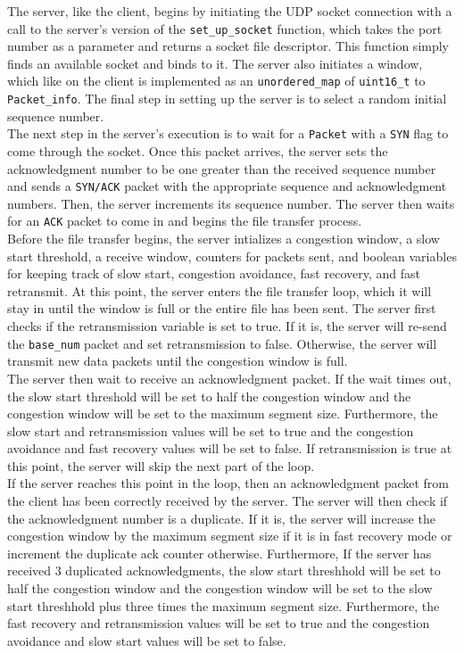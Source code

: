 \documentclass{article}
\begin{document}
\noindent
The server, like the client, begins by initiating the UDP socket connection with a call to the server's version of the \texttt{set\_up\_socket} function, which takes the port number as a parameter and returns a socket file descriptor. This function simply finds an available socket and binds to it. The server also initiates a window, which like on the client is implemented as an \texttt{unordered\_map} of \texttt{uint16\_t} to \texttt{Packet\_info}. The final step in setting up the server is to select a random initial sequence number. \\

\noindent
The next step in the server's execution is to wait for a \texttt{Packet} with a \texttt{SYN} flag to come through the socket. Once this packet arrives, the server sets the acknowledgment number to be one greater than the received sequence number and sends a \texttt{SYN/ACK} packet with the appropriate sequence and acknowledgment numbers. Then, the server increments its sequence number. The server then waits for an \texttt{ACK} packet to come in and begins the file transfer process. \\

\noindent
Before the file transfer begins, the server intializes a congestion window, a slow start threshold, a receive window, counters for packets sent, and boolean variables for keeping track of slow start, congestion avoidance, fast recovery, and fast retransmit. At this point, the server enters the file transfer loop, which it will stay in until the window is full or the entire file has been sent. The server first checks if the retransmission variable is set to true. If it is, the server will re-send the \texttt{base\_num} packet and set retransmission to false. Otherwise, the server will transmit new data packets until the congestion window is full. \\ 

\noindent
The server then wait to receive an acknowledgment packet. If the wait times out, the slow start threshold will be set to half the congestion window and the congestion window will be set to the maximum segment size. Furthermore, the slow start and retransmission values will be set to true and the congestion avoidance and fast recovery values will be set to false. If retransmission is true at this point, the server will skip the next part of the loop. \\

\noindent
If the server reaches this point in the loop, then an acknowledgment packet from the client has been correctly received by the server. The server will then check if the acknowledgment number is a duplicate. If it is, the server will increase the congestion window by the maximum segment size if it is in fast recovery mode or increment the duplicate ack counter otherwise. Furthermore, If the server has received 3 duplicated acknowledgments, the slow start threshhold will be set to half the congestion window and the congestion window will be set to the slow start threshhold plus three times the maximum segment size. Furthermore, the fast recovery and retransmission values will be set to true and the congestion avoidance and slow start values will be set to false. \\
\end{document}
